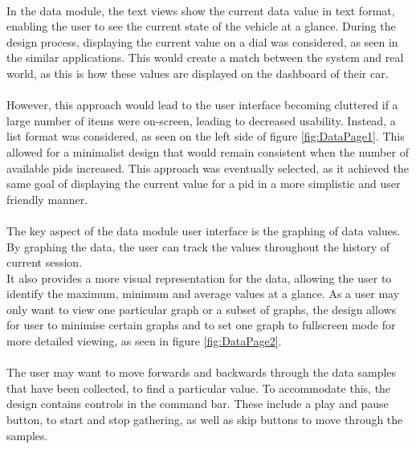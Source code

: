 		\paragraph{}{
		In the data module, the text views show the current data value in text format, enabling the user to see the current state of the vehicle at a glance. During the design process, displaying the current value on a dial was considered, as seen in the similar applications. This would create a match between the system and real world, as this is how these values are displayed on the dashboard of their car.
		}
		\paragraph{}{
		However, this approach would lead to the user interface becoming cluttered if a large number of items were on-screen, leading to decreased usability. Instead, a list format was considered, as seen on the left side of figure \ref{fig:DataPage1}. This allowed for a minimalist design that would remain consistent when the number of available pids increased. This approach was eventually selected, as it achieved the same goal of displaying the current value for a pid in a more simplistic and user friendly manner.
		}
		\paragraph{}{
		The key aspect of the data module user interface is the graphing of data values. By graphing the data, the user can track the values throughout the history of current session. 
\\		
		It also provides a more visual representation for the data, allowing the user to identify the maximum, minimum and average values at a glance. As a user may only want to view one particular graph or a subset of graphs, the design allows for user to minimise certain graphs and to set one graph to fullscreen mode for more detailed viewing, as seen in figure \ref{fig:DataPage2}.
		}
		\paragraph{}{
		The user may want to move forwards and backwards through the data samples that have been collected, to find a particular value. To accommodate this, the design contains controls in the command bar. These include a play and pause button, to start and stop gathering, as well as skip buttons to move through the samples.
		}
		
